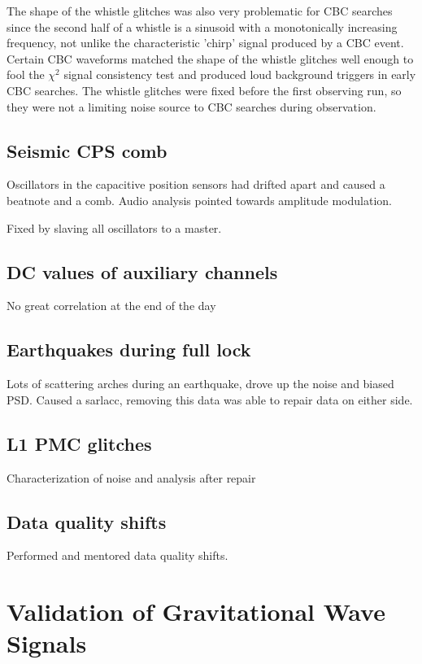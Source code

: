 The shape of the whistle 
glitches was also very problematic for CBC searches since the second half of a 
whistle is a sinusoid with a monotonically increasing frequency, not unlike the 
characteristic 'chirp' signal produced by a CBC event. Certain CBC waveforms 
matched the shape of the whistle glitches well enough to fool the $\chi^2$ signal 
consistency test and produced loud background triggers in early CBC searches. 
The whistle glitches 
were fixed before the first observing run, so they were not a limiting noise source 
to CBC searches during observation.

\subsection{Seismic CPS comb}

Oscillators in the capacitive position sensors had drifted apart and caused a 
beatnote and a comb. Audio analysis pointed towards amplitude modulation. 

Fixed by slaving all oscillators to a master.

\subsection{DC values of auxiliary channels}

No great correlation at the end of the day 

\subsection{Earthquakes during full lock}

Lots of scattering arches during an earthquake, drove up the noise and biased PSD.
Caused a sarlacc, removing this data was able to repair data on either side.

\subsection{L1 PMC glitches}


Characterization of noise and analysis after repair

\subsection{Data quality shifts}
Performed and mentored data quality shifts.

\section{Validation of Gravitational Wave Signals}\label{sec:GW150914-validation}

